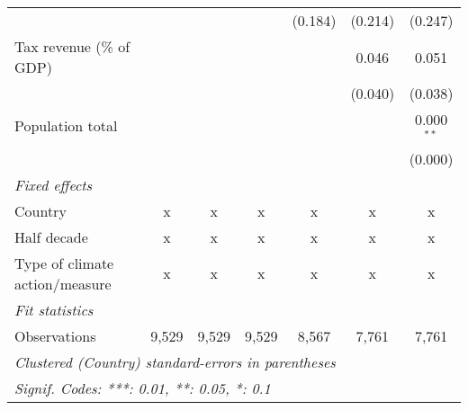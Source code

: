 \begin{tabular}{lcccccc}
                                                   &             &              &               & (0.184)      & (0.214)      & (0.247)\\   
   Tax revenue (\% of GDP)                         &             &              &               &              & 0.046        & 0.051\\   
                                                   &             &              &               &              & (0.040)      & (0.038)\\   
   Population total                                &             &              &               &              &              & 0.000$^{**}$\\   
                                                   &             &              &               &              &              & (0.000)\\   
   \emph{Fixed effects}\\
   Country                                         & x           & x            & x             & x            & x            & x\\  
   Half decade                                     & x           & x            & x             & x            & x            & x\\  
   Type of climate action/measure                  & x           & x            & x             & x            & x            & x\\  
   \midrule \emph{Fit statistics}\\
   Observations                                    & 9,529       & 9,529        & 9,529         & 8,567        & 7,761        & 7,761\\  
   \midrule
   \multicolumn{7}{l}{\emph{Clustered (Country) standard-errors in parentheses}}\\
   \multicolumn{7}{l}{\emph{Signif. Codes: ***: 0.01, **: 0.05, *: 0.1}}\\
\end{tabular}
\par\endgroup


